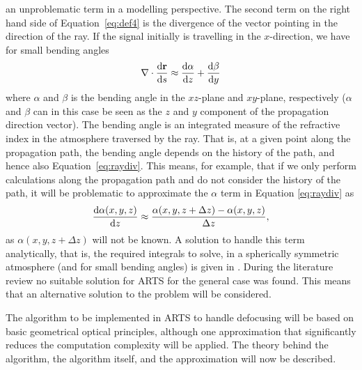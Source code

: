 an unproblematic term in a modelling perspective.
The second term on the right hand side of Equation~\ref{eq:def4}
is the divergence of the vector pointing in the direction 
of the ray.  If the signal initially is travelling in the \(x\)-direction,
we have for small bending angles \citep{haugstad:78:turbu}
\begin{equation}
\label{eq:raydiv}
\nabla \cdot \frac{\mathrm{d} \bf{\ensuremath{r}}}{\mathrm{d} s}\approx
\frac{\mathrm{d} \alpha}{\mathrm{d} z}+\frac{\mathrm{d} \beta}{\mathrm{d} y}
\end{equation}
 where \(\alpha\) and  \(\beta\) is the bending angle in the \(xz\)-plane
and \(xy\)-plane, respectively (\(\alpha\) and  \(\beta\) can in this
case be seen as  the \(z\) and \(y\) component of the propagation
direction vector).
The bending
angle is an integrated measure of the refractive index in 
the atmosphere traversed by the ray. That is, at a given point
along the propagation path, the bending angle depends
on the history of the path, and hence also Equation~\ref{eq:raydiv}.
This means, for example, that if we only perform calculations
along the propagation path and do not consider the history of the path, 
it will be problematic to approximate the \(\alpha\) term in 
Equation \ref{eq:raydiv} as
\begin{equation}
\frac{\mathrm{d} \alpha(x,y,z)}{\mathrm{d} z}\approx
\frac{\alpha(x,y,z+\Delta z)-\alpha(x,y,z)}{\Delta z},
\end{equation}
as \(\alpha(x,y,z+\Delta z)\) will not be known.
A solution to handle this term analytically, that is, the required 
integrals to solve, in a spherically symmetric atmosphere (and for small bending angles) is given in \citet{haugstad:78:turbu}. 
During the literature review no suitable solution for ARTS for
the general case was found.
This means that an alternative solution to the problem will be considered.

The algorithm to be implemented in ARTS to handle defocusing will be based on
basic geometrical optical principles, although one approximation that
significantly reduces the computation complexity will be applied. The theory
behind the algorithm, the algorithm itself, and the approximation will now be
described.

